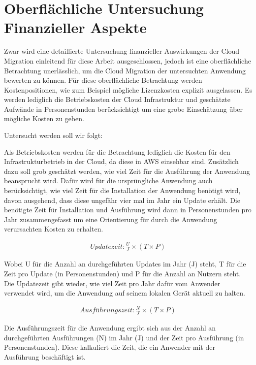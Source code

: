 \section{Oberflächliche Untersuchung Finanzieller Aspekte}
Zwar wird eine detaillierte Untersuchung finanzieller Auswirkungen der Cloud Migration einleitend für diese Arbeit ausgeschlossen, jedoch ist eine oberflächliche Betrachtung unerlässlich, um die Cloud Migration der untersuchten Anwendung bewerten zu können. Für diese oberflächliche Betrachtung werden Kostenpositionen, wie zum Beispiel mögliche Lizenzkosten explizit ausgelassen. Es werden lediglich die Betriebskosten der Cloud Infrastruktur und geschätzte Aufwände in Personenstunden berücksichtigt um eine grobe Einschätzung über mögliche Kosten zu geben.

Untersucht werden soll wir folgt:

Als Betriebskosten werden für die Betrachtung lediglich die Kosten für den Infrastrukturbetrieb in der Cloud, da diese in \ac{AWS} einsehbar sind. Zusätzlich dazu soll grob geschätzt werden, wie viel Zeit für die Ausführung der Anwendung beansprucht wird. Dafür wird für die ursprüngliche Anwendung auch berücksichtigt, wie viel Zeit für die Installation der Anwendung benötigt wird, davon ausgehend, dass diese ungefähr vier mal im Jahr ein Update erhält. Die benötigte Zeit für Installation und Ausführung wird dann in Personenstunden pro Jahr zusammengefasst um eine Orientierung für durch die Anwendung verursachten Kosten zu erhalten.

\begin{align}
    Updatezeit: \frac{U}{J} \times \left(T \times P\right) 
\end{align}

Wobei U für die Anzahl an durchgeführten Updates im Jahr (J) steht, T für die Zeit pro Update (in Personenstunden) und P für die Anzahl an Nutzern steht. Die Updatezeit gibt wieder, wie viel Zeit pro Jahr dafür vom Anwender verwendet wird, um die Anwendung auf seinem lokalen Gerät aktuell zu halten.

\begin{align}
    Ausführungszeit: \frac{N}{J} \times \left(T \times P\right) 
\end{align}

Die Ausführungszeit für die Anwendung ergibt sich aus der Anzahl an durchgeführten Ausführungen (N) im Jahr (J) und der Zeit pro Ausführung (in Personenstunden). Diese kalkuliert die Zeit, die ein Anwender mit der Ausführung beschäftigt ist. \pagebreak

